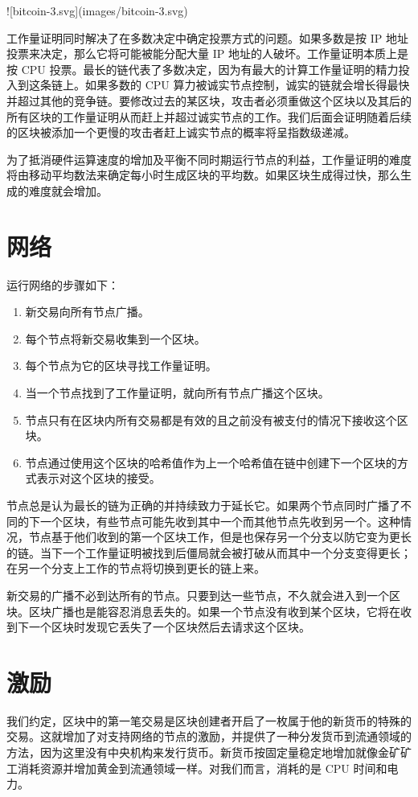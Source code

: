 \documentclass{article}
\begin{document}
![bitcoin-3.svg](images/bitcoin-3.svg)

工作量证明同时解决了在多数决定中确定投票方式的问题。如果多数是按 IP 地址投票来决定，那么它将可能被能分配大量 IP 地址的人破坏。工作量证明本质上是按 CPU 投票。最长的链代表了多数决定，因为有最大的计算工作量证明的精力投入到这条链上。如果多数的 CPU 算力被诚实节点控制，诚实的链就会增长得最快并超过其他的竞争链。要修改过去的某区块，攻击者必须重做这个区块以及其后的所有区块的工作量证明从而赶上并超过诚实节点的工作。我们后面会证明随着后续的区块被添加一个更慢的攻击者赶上诚实节点的概率将呈指数级递减。

为了抵消硬件运算速度的增加及平衡不同时期运行节点的利益，工作量证明的难度将由移动平均数法来确定每小时生成区块的平均数。如果区块生成得过快，那么生成的难度就会增加。

\section{网络}
运行网络的步骤如下：

\begin{enumerate}
 \item 新交易向所有节点广播。
 \item 每个节点将新交易收集到一个区块。
 \item 每个节点为它的区块寻找工作量证明。
 \item 当一个节点找到了工作量证明，就向所有节点广播这个区块。
 \item 节点只有在区块内所有交易都是有效的且之前没有被支付的情况下接收这个区块。
 \item 节点通过使用这个区块的哈希值作为上一个哈希值在链中创建下一个区块的方式表示对这个区块的接受。
\end{enumerate}

节点总是认为最长的链为正确的并持续致力于延长它。如果两个节点同时广播了不同的下一个区块，有些节点可能先收到其中一个而其他节点先收到另一个。这种情况，节点基于他们收到的第一个区块工作，但是也保存另一个分支以防它变为更长的链。当下一个工作量证明被找到后僵局就会被打破从而其中一个分支变得更长；在另一个分支上工作的节点将切换到更长的链上来。

新交易的广播不必到达所有的节点。只要到达一些节点，不久就会进入到一个区块。区块广播也是能容忍消息丢失的。如果一个节点没有收到某个区块，它将在收到下一个区块时发现它丢失了一个区块然后去请求这个区块。

\section{激励}
我们约定，区块中的第一笔交易是区块创建者开启了一枚属于他的新货币的特殊的交易。这就增加了对支持网络的节点的激励，并提供了一种分发货币到流通领域的方法，因为这里没有中央机构来发行货币。新货币按固定量稳定地增加就像金矿矿工消耗资源并增加黄金到流通领域一样。对我们而言，消耗的是 CPU 时间和电力。
\end{document}
